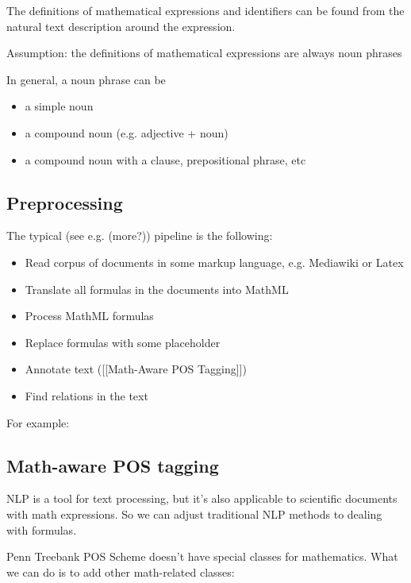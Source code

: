 The definitions of mathematical expressions and identifiers can be found from
the natural text description around the expression.

Assumption: the definitions of mathematical expressions are always noun phrases

In general, a noun phrase can be

\begin{itemize}
  \item a simple noun
  \item a compound noun (e.g. adjective + noun)
  \item a compound noun with a clause, prepositional phrase, etc
\end{itemize}



\subsection{Preprocessing}

The typical (see e.g. \cite{kristianto2012extracting, pagael2014mlp} (more?)) pipeline is the following:

\begin{itemize}
  \item Read corpus of documents in some markup language, e.g. Mediawiki or Latex
  \item Translate all formulas in the documents into MathML 
  \item Process MathML formulas
  \item Replace formulas with some placeholder
  \item Annotate text ([[Math-Aware POS Tagging]])
  \item Find relations in the text
\end{itemize}


For example:




\subsection{Math-aware POS tagging}

NLP is a tool for text processing, but it's also applicable to scientific documents with math expressions. So we can adjust traditional NLP methods to dealing with formulas.


Penn Treebank POS Scheme \cite{santorini1990part}  doesn't have special classes for mathematics.
What we can do is to add other math-related classes:


